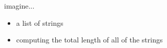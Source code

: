 \documentclass[include/preamble.tex]{subfiles}
\begin{document}

\newsavebox{\boxA}
\newsavebox{\boxB}
\newsavebox{\boxC}
\newsavebox{\boxD}

\begin{frame}[fragile]
  \begin{center}
    \begin{flushleft}
      imagine...
    \end{flushleft}
    \begin{itemize}
      \pause
    \item a list of strings
      \pause
    \item computing the total length of all of the strings
    \end{itemize}
  \end{center}
\end{frame}
\end{document}
